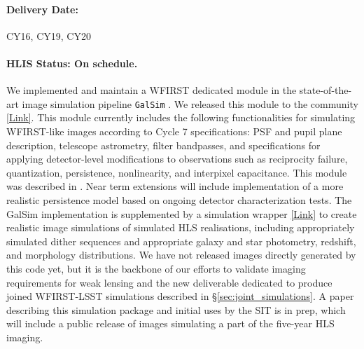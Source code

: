 \paragraph*{Delivery Date:} CY16, CY19, CY20

\paragraph*{HLIS Status: On schedule.} We implemented and maintain a
WFIRST dedicated module in the state-of-the-art image simulation
pipeline \texttt{GalSim} \citep{Rowe:2015}. We released this module to the community
\href{https://github.com/GalSim-developers/GalSim}{[Link]}. This module currently includes the following functionalities for simulating WFIRST-like images according to Cycle 7 specifications: PSF and pupil plane description, telescope astrometry, filter bandpasses, and specifications for applying detector-level modifications to observations such as reciprocity failure, quantization, persistence, nonlinearity, and interpixel capacitance. This module was described in \cite{Kannawadi2016}.  Near term extensions will include  implementation of a more realistic persistence model based on ongoing detector characterization tests. The GalSim implementation is supplemented by a simulation wrapper \href{https://github.com/matroxel/wfirst_imsim/}{[Link]} to create realistic image simulations of simulated HLS realisations, including appropriately simulated dither sequences and appropriate galaxy and star photometry, redshift, and morphology distributions.  We have not released images directly generated by this code yet, but it is the backbone of our efforts to validate imaging requirements for weak lensing and the new deliverable dedicated to produce joined WFIRST-LSST simulations described in \S\ref{sec:joint_simulations}. A paper describing this simulation package and initial uses by the SIT is in prep, which will include a public release of images simulating a part of the five-year HLS imaging.

